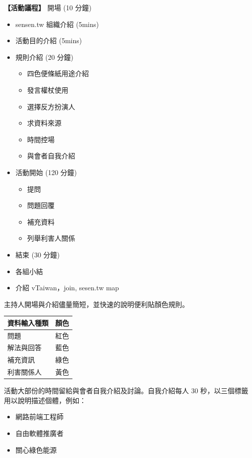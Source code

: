 \documentclass[12pt,a4paper]{article}
\begin{document}
\begin{enumerate}
\begin{enumerate}
\textbf{【活動議程】}
開場 (10 分鐘)
\begin{itemize}
\item sensen.tw 組織介紹 (5mins)
\item 活動目的介紹 (5mins)
\item 規則介紹 (20 分鐘)
\begin{itemize}
\item 四色便條紙用途介紹
\item 發言權杖使用
\item 選擇反方扮演人
\item 求資料來源
\item 時間控場
\item 與會者自我介紹
\end{itemize}
\item 活動開始 (120 分鐘)
\begin{itemize}
\item 提問
\item 問題回覆
\item 補充資料
\item 列舉利害人關係
\end{itemize}
\item 結束 (30 分鐘)
\item 各組小結
\item 介紹 vTaiwan，join, sesen.tw map
\end{itemize}

主持人開場與介紹儘量簡短，並快速的說明便利貼顏色規則。

\begin{center}
\label{tbl:map-data-input-filter}
\begin{tabular}{l|l}
\toprule
資料輸入種類 & 顏色\\
\midrule
問題 & 紅色\\
解法與回答 & 藍色\\
補充資訊 & 綠色\\
利害關係人 & 黃色\\
\bottomrule
\end{tabular}
\end{center}

活動大部份的時間留給與會者自我介紹及討論。自我介紹每人 30 秒，以三個標籤用以說明描述個體，例如：

\begin{itemize}
\item 網路前端工程師
\item 自由軟體推廣者
\item 關心綠色能源
\end{itemize}


\end{enumerate}
\end{enumerate}
\end{document}
